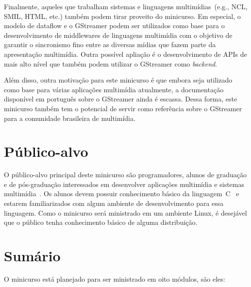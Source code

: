 \documentclass{SBCbookchapter}
\begin{document}
Finalmente, aqueles que trabalham sistemas e linguagens multimídias~(e.g., NCL,
SMIL, HTML, etc.) também podem tirar proveito do minicurso. Em especial, o
modelo de dataflow e o GStreamer podem ser utilizados como base para o
desenvolvimento de middlewares de linguagens multimídia com o objetivo de
garantir o sincronismo fino entre as diversas mídias que fazem parte da
apresentação multimídia. Outra possível apliação é o desenvolvimento de APIs de
mais alto nível que também podem utilizar o GStreamer como \emph{backend}.

Além disso, outra motivação para este minicurso é que embora seja utilizado
como base para várias aplicações multimídia atualmente, a documentação
disponível em português sobre o GStreamer ainda é escassa. Dessa forma, este
minicurso também tem o potencial de servir como referência sobre o GStreamer
para a comunidade brasileira de multimídia.


\section{Público-alvo}
O público-alvo principal deste minicurso são programadores, alunos de graduação
e de pós-graduação interessados em desenvolver aplicações multimídia
e sistemas multimídia~\cite{?}.  Os alunos devem possuir conhecimento básico da
linguagem~C~\cite{?} e estarem familiarizados com algum ambiente de
desenvolvimento para essa linguagem.  Como o minicurso será ministrado em um
ambiente Linux, é desejável que o público tenha conhecimento básico de alguma
distribuição.


\section{Sumário}
O minicurso está planejado para ser ministrado em oito módulos, são eles:
\end{document}
